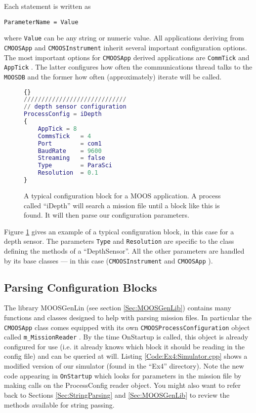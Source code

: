 \documentclass[a4paper,10pt]{article}
\newcommand{\Code}[1]{\texttt{#1} }
\newcommand{\code}[1]{\Code{#1} }
\begin{document}
Each statement is written as
\begin{center}
\code{ParameterName = Value}
\end{center}
where \code{Value} can be any string or numeric value. All
applications deriving from \code{CMOOSApp} and
\code{CMOOSInstrument} inherit several important configuration
options. The most important options for \code{CMOOSApp} derived applications
are  \code{CommTick} and \code{AppTick}. The latter configures how often the
communications thread talks to the \code{MOOSDB} and the former how often (approximately)
iterate will be called.


\begin{figure}\label{fig:ProcConfig}
\caption{A typical configuration block for a MOOS application. A
process called ``iDepth'' will search a mission file until a block
like this is found. It will then parse our configuration
parameters.}
\begin{lstlisting}[language = {matlab}]{}
/////////////////////////////
// depth sensor configuration
ProcessConfig = iDepth
{
    AppTick = 8
    CommsTick   = 4
    Port        = com1
    BaudRate    = 9600
    Streaming   = false
    Type        = ParaSci
    Resolution  = 0.1
}
\end{lstlisting}
\end{figure}
Figure \ref{fig:ProcConfig} gives an example of a typical
configuration block, in this case for a depth sensor. The
parameters \code{Type} and \code{Resolution} are specific to the
class defining the methods of a ``DepthSensor''. All the other
parameters are handled by its base classes
--- in this case (\code{CMOOSInstrument} and \code{CMOOSApp}).

\subsection{Parsing Configuration Blocks}

The library MOOSGenLin (see section \ref{Sec:MOOSGenLib}) contains many functions and classes
designed to help with parsing mission files. In particular the \code{CMOOSApp} class comes equipped with its own
\code{CMOOSProcessConfiguration} object called \code{m\_MissionReader}. By the time OnStartup is called, this object is already configured for use (i.e. it already knows which block it should be reading in the config file) and can be queried at will.
Listing \ref{Code:Ex4:Simulator.cpp} shows a modified version of our simulator (found in the ``Ex4'' directory). Note the new code appearing in \code{OnStartup} which looks for parameters in the mission file by making calls on the ProcessConfig reader object. You might also want to refer back to Sections \ref{Sec:StringParsing} and  \ref{Sec:MOOSGenLib}  to review the methods available for string passing.
\end{document}
